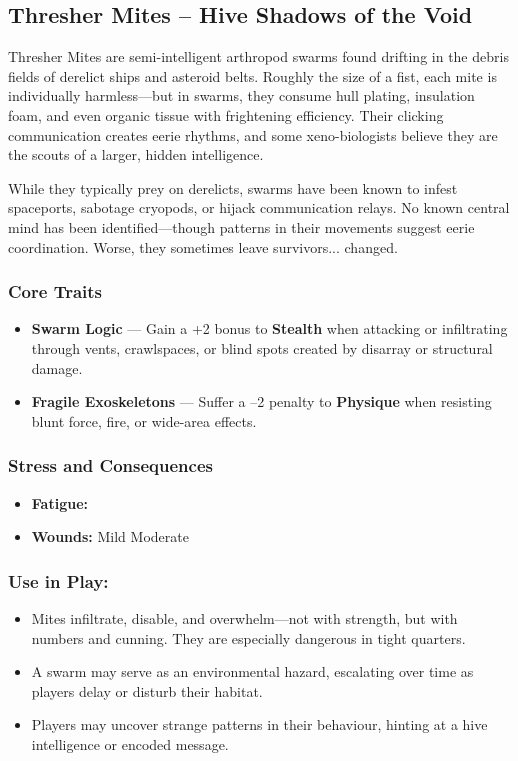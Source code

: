 \subsection*{Thresher Mites – Hive Shadows of the Void}

Thresher Mites are semi-intelligent arthropod swarms found drifting in the debris fields of derelict ships and asteroid belts. Roughly the size of a fist, each mite is individually harmless—but in swarms, they consume hull plating, insulation foam, and even organic tissue with frightening efficiency. Their clicking communication creates eerie rhythms, and some xeno-biologists believe they are the scouts of a larger, hidden intelligence.

While they typically prey on derelicts, swarms have been known to infest spaceports, sabotage cryopods, or hijack communication relays. No known central mind has been identified—though patterns in their movements suggest eerie coordination. Worse, they sometimes leave survivors... changed.

\subsubsection*{Core Traits}
\begin{itemize}
  \item \textbf{Swarm Logic} — Gain a +2 bonus to \textbf{Stealth} when attacking or infiltrating through vents, crawlspaces, or blind spots created by disarray or structural damage.

  \item \textbf{Fragile Exoskeletons} — Suffer a –2 penalty to \textbf{Physique} when resisting blunt force, fire, or wide-area effects.
\end{itemize}

\subsubsection*{Stress and Consequences}
\begin{itemize}
  \item \textbf{Fatigue:} \FatigueBox \FatigueBox \FatigueBox
  \item \textbf{Wounds:} Mild \MildWound \quad Moderate \ModerateWound
\end{itemize}

\subsubsection*{Use in Play:}
\begin{itemize}
  \item Mites infiltrate, disable, and overwhelm—not with strength, but with numbers and cunning. They are especially dangerous in tight quarters.
  \item A swarm may serve as an environmental hazard, escalating over time as players delay or disturb their habitat.
  \item Players may uncover strange patterns in their behaviour, hinting at a hive intelligence or encoded message.
\end{itemize}

